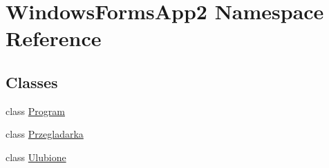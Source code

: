 \hypertarget{namespace_windows_forms_app2}{}\section{Windows\+Forms\+App2 Namespace Reference}
\label{namespace_windows_forms_app2}
\subsection*{Classes}
\begin{DoxyCompactItemize}
\item 
class \hyperlink{class_windows_forms_app2_1_1_program}{Program}
\item 
class \hyperlink{class_windows_forms_app2_1_1_przegladarka}{Przegladarka}
\item 
class \hyperlink{class_windows_forms_app2_1_1_ulubione}{Ulubione}
\end{DoxyCompactItemize}
